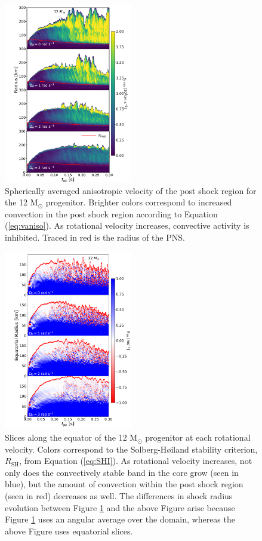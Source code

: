 \documentclass[twocolumn,times]{aastex62}  %
\newcommand{\Msun}{\ensuremath{\mathrm{M}_\odot}\xspace}
\begin{document}
\begin{figure}[]
    \centering
    \includegraphics[width=0.5\textwidth]{figures/vaniso_rad.pdf}
    \caption{Spherically averaged anisotropic velocity of the post shock region for the 12 \Msun progenitor.  Brighter colors correspond to increased convection in the post shock region according to Equation (\ref{eq:vaniso}).  As rotational velocity increases, convective activity is inhibited.  Traced in red is the radius of the PNS.}
    \label{fig:vaniso}
\end{figure}

\begin{figure}[]
    \centering
    \includegraphics[width=0.5\textwidth]{figures/SHI_panel_invert.pdf}
    \caption{Slices along the equator of the 12 \Msun progenitor at each rotational velocity.  Colors correspond to the Solberg-H{\o}iland stability criterion, $R_{\mathrm{SH}}$, from Equation (\ref{eq:SHI}).  As rotational velocity increases, not only does the convectively stable band in the core grow (seen in blue), but the amount of convection within the post shock region (seen in red) decreases as well.  The differences in shock radius evolution between Figure \ref{fig:vaniso} and the above Figure arise because Figure \ref{fig:vaniso} uses an angular average over the domain, whereas the above Figure uses equatorial slices.}
    \label{fig:SHI}
\end{figure}
\end{document}
